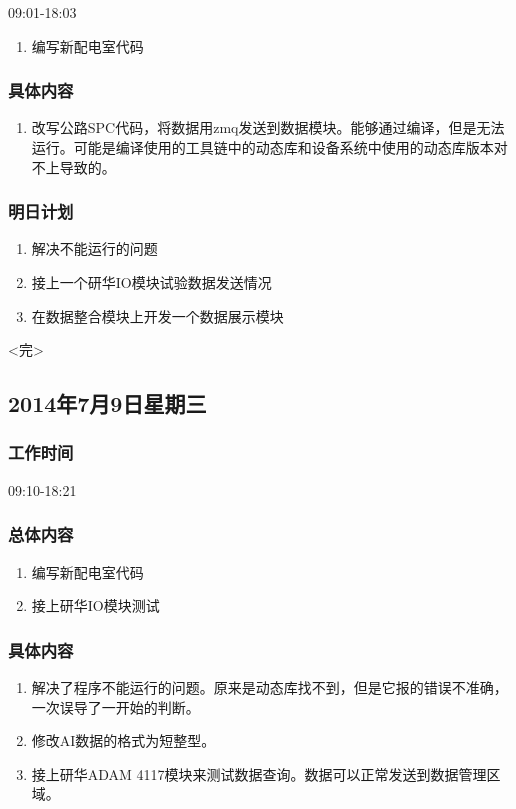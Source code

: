 \documentclass[11pt]{article}
\begin{document}
  09:01-18:03

  \begin{enumerate}
  \item 编写新配电室代码
  \end{enumerate}
\subsubsection{具体内容}
  \begin{enumerate}
  \item 改写公路SPC代码，将数据用zmq发送到数据模块。能够通过编译，但是无法运行。可能是编译使用的工具链中的动态库和设备系统中使用的动态库版本对不上导致的。
  \end{enumerate}
\subsubsection{明日计划}
  \begin{enumerate}
  \item 解决不能运行的问题
  \item 接上一个研华IO模块试验数据发送情况
  \item 在数据整合模块上开发一个数据展示模块
  \end{enumerate}



\centerline{<完>}


\newpage
\subsection{2014年7月9日星期三}

\subsubsection{工作时间}

  09:10-18:21
\subsubsection{总体内容}
  \begin{enumerate}
  \item 编写新配电室代码
  \item 接上研华IO模块测试
  \end{enumerate}
\subsubsection{具体内容}
  \begin{enumerate}
  \item 解决了程序不能运行的问题。原来是动态库找不到，但是它报的错误不准确，一次误导了一开始的判断。
  \item 修改AI数据的格式为短整型。
  \item 接上研华ADAM 4117模块来测试数据查询。数据可以正常发送到数据管理区域。
  \end{enumerate}
\end{document}
